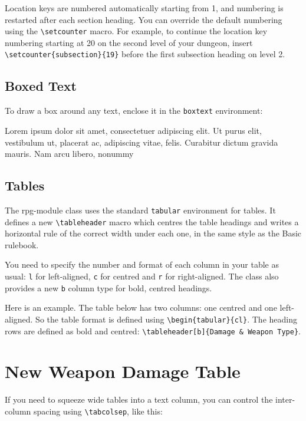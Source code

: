 \documentclass[letterpaper,serif]{rpg-module}
\begin{document}
Location keys are numbered automatically starting from 1, and numbering is restarted after each section heading. You can override
the default numbering using the \verb|\setcounter| macro. For example, to continue the location key numbering starting at 20 on the
second level of your dungeon, insert \verb|\setcounter{subsection}{19}| before the first subsection heading on level 2.

\subsection*{Boxed Text}

To draw a box around any text, enclose it in the \verb|boxtext| environment:

\begin{boxtext}
Lorem ipsum dolor sit amet, consectetuer adipiscing elit. Ut
purus elit, vestibulum ut, placerat ac, adipiscing vitae, felis.
Curabitur dictum gravida mauris. Nam arcu libero, nonummy
\end{boxtext}

\subsection*{Tables}

The rpg-module class uses the standard \verb|tabular| environment for tables. It defines a new \verb|\tableheader| macro which centres
the table headings and writes a horizontal rule of the correct width under each one, in the same style as the Basic rulebook.

You need to specify the number and format of each column in your table as usual: \verb|l| for left-aligned, \verb|c| for centred
and \verb|r| for right-aligned. The class also provides a new \verb|b| column type for bold, centred headings.

Here is an example. The table below has two columns: one centred and one left-aligned. So the table format
is defined using \verb|\begin{tabular}{cl}|. The heading rows are defined as bold and centred: \verb|\tableheader[b]{Damage & Weapon Type}|.

\section*{New Weapon Damage Table}


If you need to squeeze wide tables into a text column, you can control the inter-column spacing using \verb|\tabcolsep|,
like this:
\end{document}
